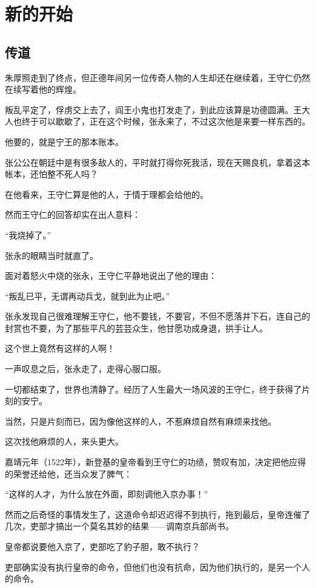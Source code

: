 \section{新的开始}
\ifnum{}
	\begin{multicols}{\theparacolNo}
\fi
\subsection{传道}
朱厚照走到了终点，但正德年间另一位传奇人物的人生却还在继续着，王守仁仍然在续写着他的辉煌。

叛乱平定了，俘虏交上去了，阎王小鬼也打发走了，到此应该算是功德圆满。王大人也终于可以歇歇了，正在这个时候，张永来了，不过这次他是来要一样东西的。

他要的，就是宁王的那本账本。

张公公在朝廷中是有很多敌人的，平时就打得你死我活，现在天赐良机，拿着这本帐本，还怕整不死人吗？

在他看来，王守仁算是他的人，于情于理都会给他的。

然而王守仁的回答却实在出人意料：

“我烧掉了。”

张永的眼睛当时就直了。

面对着怒火中烧的张永，王守仁平静地说出了他的理由：

“叛乱已平，无谓再动兵戈，就到此为止吧。”

张永发现自己很难理解王守仁，他不要钱，不要官，不但不愿落井下石，连自己的封赏也不要，为了那些平凡的芸芸众生，他甘愿功成身退，拱手让人。

这个世上竟然有这样的人啊！

一声叹息之后，张永走了，走得心服口服。

一切都结束了，世界也清静了。经历了人生最大一场风波的王守仁，终于获得了片刻的安宁。

当然，只是片刻而已，因为像他这样的人，不惹麻烦自然有麻烦来找他。

这次找他麻烦的人，来头更大。

嘉靖元年（1522年），新登基的皇帝看到王守仁的功绩，赞叹有加，决定把他应得的荣誉还给他，还当众发了脾气：

“这样的人才，为什么放在外面，即刻调他入京办事！”

然而之后奇怪的事情发生了，这道命令却迟迟得不到执行，拖到最后，皇帝连催了几次，吏部才搞出一个莫名其妙的结果——调南京兵部尚书。

皇帝都说要他入京了，吏部吃了豹子胆，敢不执行？

吏部确实没有执行皇帝的命令，但他们也没有抗命，因为他们执行的，是另一个人的命令。


\end{multicols}
